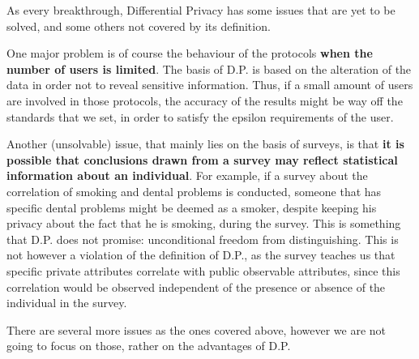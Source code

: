 As every breakthrough, Differential Privacy has some issues that are yet to be solved, and some others not covered by its definition. 

One major problem is of course the behaviour of the protocols \textbf{when the number of users is limited}. The basis of D.P. is based on the alteration of the data in order not to reveal sensitive information. Thus, if a small amount of users are involved in those protocols, the accuracy of the results might be way off the standards that we set, in order to satisfy the epsilon requirements of the user.

Another (unsolvable) issue, that mainly lies on the basis of surveys, is that \textbf{it is possible that conclusions drawn from a survey may reflect statistical information about
an individual}. For example, if a survey about the correlation of smoking and dental problems is conducted, someone that has specific dental problems might be deemed as a smoker, despite keeping his privacy about the fact that he is smoking, during the survey. This is something that D.P. does not promise: unconditional freedom from distinguishing. This is not however a violation of the definition of D.P., as the survey teaches us that specific private attributes correlate with public observable attributes, since this correlation would be observed independent of the presence or absence of the individual in the survey.

There are several more issues as the ones covered above, however we are not going to focus on those, rather on the advantages of D.P.